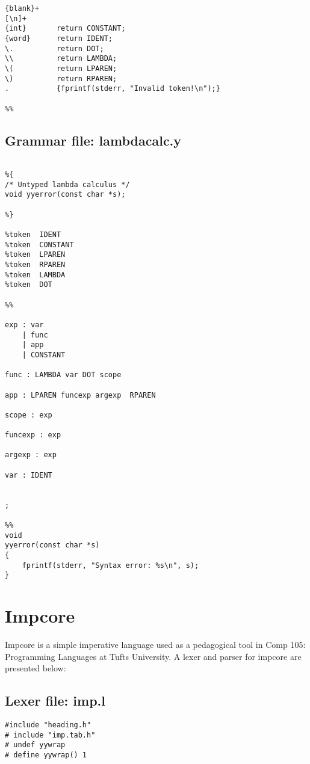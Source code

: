 \begin{appendices}
\begin{Verbatim}[frame=single]
%%
{blank}+
[\n]+
{int}       return CONSTANT;
{word}      return IDENT;
\.          return DOT;
\\          return LAMBDA;
\(          return LPAREN;
\)          return RPAREN;
.           {fprintf(stderr, "Invalid token!\n");}

%%
\end{Verbatim}

\subsection{Grammar file: lambdacalc.y}

\begin{Verbatim}[frame=single]

%{
/* Untyped lambda calculus */
void yyerror(const char *s);

%}

%token  IDENT
%token  CONSTANT
%token  LPAREN
%token  RPAREN
%token  LAMBDA
%token  DOT

%%

exp : var
    | func
    | app
    | CONSTANT

func : LAMBDA var DOT scope

app : LPAREN funcexp argexp  RPAREN

scope : exp

funcexp : exp

argexp : exp

var : IDENT


;

%%
void
yyerror(const char *s)
{
    fprintf(stderr, "Syntax error: %s\n", s);
}

\end{Verbatim}

\section{Impcore}

Impcore is a simple imperative language used as a pedagogical tool in Comp 105: Programming Languages at Tufts University. A lexer and parser for impcore are presented below:

\subsection{Lexer file: imp.l}

\begin{Verbatim}[frame=single]
%{
#include "heading.h"
# include "imp.tab.h"
# undef yywrap
# define yywrap() 1


\end{Verbatim}
\end{appendices}
